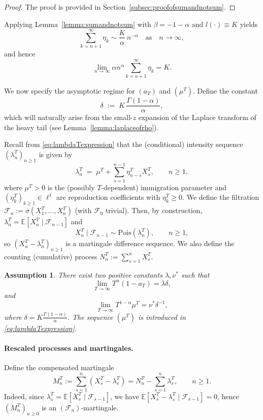 \documentclass[letterpaper]{article}
\numberwithin{equation}{section}
\newtheorem{assumption}[theorem]{Assumption}
\theoremstyle{definition}
\theoremstyle{remark}
\begin{document}
{
\begin{proof}
    The proof is provided in Section~\ref{subsec:proofofsumandnotsum}.
\end{proof}
}

{Applying Lemma~\ref{lemma:sumandnotsum} with $\beta=-1-\alpha$ and $l(\cdot)\equiv K$ yields}
\[
  {\sum_{k=n+1}^\infty \eta_k \sim \frac{K}{\alpha}\,n^{-\alpha}\quad\text{as}\quad n\to\infty,}
\]
{and hence}
\[
  \lim_{n\to\infty} \alpha n^\alpha \sum_{k=n+1}^\infty \eta_k = K.
\]

We now specify the asymptotic regime for $(a_T)$ and $(\mu^T)$.
Define the constant
\[
  \delta \;:=\; K\,\frac{\Gamma(1-\alpha)}{\alpha},
\]
which will naturally arise from the small-$z$ expansion of the Laplace transform of the heavy tail (see Lemma~\ref{lemma:laplaceofrho}).

Recall from \eqref{eq:lambdaTexpression} that the (conditional) intensity sequence $(\lambda_n^T)_{n\ge1}$ is given by
\[
  \lambda_n^T \;=\; \mu^T + \sum_{s=1}^{n-1}\eta_{n-s}^T X_s^T,\qquad n\ge1,
\]
where $\mu^T>0$ is the (possibly $T$-dependent) immigration parameter and $(\eta_k^T)_{k\ge1}\in\ell^1$ are reproduction coefficients with $\eta_k^T\ge0$.
{We define the filtration $\mathcal{F}_n:=\sigma(X_1^T,\dots,X_n^T)$ (with $\mathcal{F}_0$ trivial). Then, by construction, $\lambda_n^T=\mathbb{E}[X_n^T\mid\mathcal{F}_{n-1}]$ and
\[
  X_n^T\mid\mathcal{F}_{n-1}\sim\mathrm{Pois}(\lambda_n^T),\qquad n\ge1,
\]
so $(X_n^T-\lambda_n^T)_{n\ge1}$ is a martingale difference sequence.}
We also define the counting (cumulative) process $N_n^T:=\sum_{s=1}^n X_s^T$.

\begin{assumption}\label{assumption:2}
  There exist two positive constants $\lambda,\nu^*$ such that
  \[
    \lim_{T\rightarrow\infty}T^\alpha(1-a_T)=\lambda\delta,
  \]
  and
  \[
    \lim_{T\rightarrow\infty}T^{1-\alpha}\mu^T=\nu^*\delta^{-1},
  \]
  where $\delta=K\frac{\Gamma(1-\alpha)}{\alpha}$. The sequence $(\mu^T)$ is {introduced}
  in \eqref{eq:lambdaTexpression}.
\end{assumption}

\paragraph{Rescaled processes and martingales.}
Define the compensated martingale
\[
  M_n^T:=\sum_{s=1}^n \left(X_s^T-\lambda_s^T\right)=N_n^T-\sum_{s=1}^n\lambda_s^T,\qquad n\ge1.
\]
{Indeed, since $\lambda_s^T=\mathbb{E}[X_s^T\mid\mathcal{F}_{s-1}]$, we have
$\mathbb{E}[X_s^T-\lambda_s^T\mid\mathcal{F}_{s-1}]=0$, hence $(M_n^T)_{n\ge0}$ is an $(\mathcal{F}_n)$-martingale.}
\end{document}
